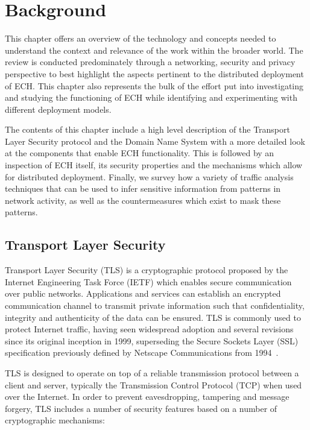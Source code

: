 \chapter{Background}\label{Background}

This chapter offers an overview of the technology and concepts needed to understand the context and relevance of the work within the broader world. The review is conducted predominately through a networking, security and privacy perspective to best highlight the aspects pertinent to the distributed deployment of ECH. This chapter also represents the bulk of the effort put into investigating and studying the functioning of ECH while identifying and experimenting with different deployment models.

The contents of this chapter include a high level description of the Transport Layer Security protocol and the Domain Name System with a more detailed look at the components that enable ECH functionality. This is followed by an inspection of ECH itself, its security properties and the mechanisms which allow for distributed deployment. Finally, we survey how a variety of traffic analysis techniques that can be used to infer sensitive information from patterns in network activity, as well as the countermeasures which exist to mask these patterns.








\section{Transport Layer Security}

Transport Layer Security (TLS) is a cryptographic protocol proposed by the Internet Engineering Task Force (IETF) which enables secure communication over public networks. Applications and services can establish an encrypted communication channel to transmit private information such that confidentiality, integrity and authenticity of the data can be ensured. TLS is commonly used to protect Internet traffic, having seen widespread adoption and several revisions since its original inception in 1999, superseding the Secure Sockets Layer (SSL) specification previously defined by Netscape Communications from 1994~\cite{chan2018monitoring, LE-HTTPS, rfc2246}.

TLS is designed to operate on top of a reliable transmission protocol between a client and server, typically the Transmission Control Protocol (TCP) when used over the Internet. In order to prevent eavesdropping, tampering and message forgery, TLS includes a number of security features based on a number of cryptographic mechanisms:

